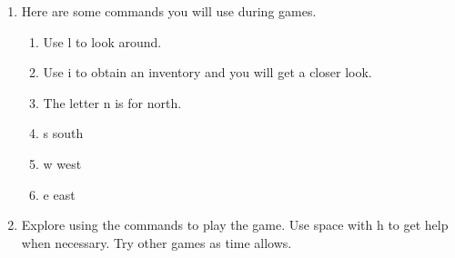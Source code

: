 \documentclass[10pt,letterpaper,twoside]{report}
\begin{document}
{{{{\begin{enumerate}
\begin{enumerate}
\begin{enumerate}
			            \item Space with 5 6 and space with 2 3 will move through your move history list.
			                  
			            \item Press space with s to save the current game.
			                  
			            \item Press enter with o to open a game that you previously saved.
			                  
			            \item Backspace with r will insert the last entered move.
			                  
			            \item To move back by sentence, press space with dot1. Press space with dots1 4 to read the current sentence.  Press space with dot4 to move forward by sentence.
			                  
			            \item Backspace with q will abandon the current game.
			                  
			                  
		            \end{enumerate}
		      \item Here are some commands you will use during games.
		            
		            \begin{enumerate}
			            \item Use l to look around.
			                  
			            \item Use i to obtain an inventory and you will get a closer look.
			                  
			            \item The letter n is for north.
			                  
			            \item s south
			                  
			            \item w west
			                  
			            \item e east
			                  
			                  
		            \end{enumerate}
		      \item Explore using the commands to play the game.  Use space with h to get help when necessary.  Try other games as time allows.
	      \end{enumerate}
	      

\end{enumerate}}}}}
\end{document}
